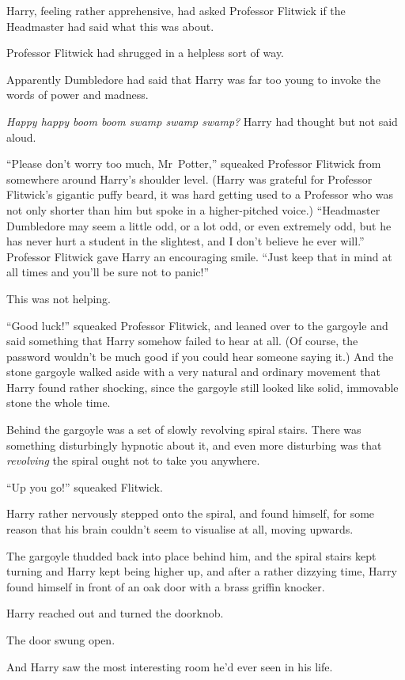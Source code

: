 Harry, feeling rather apprehensive, had asked Professor Flitwick if the Headmaster had said what this was about.

Professor Flitwick had shrugged in a helpless sort of way.

Apparently Dumbledore had said that Harry was far too young to invoke the words of power and madness.

\emph{Happy happy boom boom swamp swamp swamp?} Harry had thought but not said aloud.

“Please don’t worry too much, Mr~Potter,” squeaked Professor Flitwick from somewhere around Harry’s shoulder level. (Harry was grateful for Professor Flitwick’s gigantic puffy beard, it was hard getting used to a Professor who was not only shorter than him but spoke in a higher-pitched voice.) “Headmaster Dumbledore may seem a little odd, or a lot odd, or even extremely odd, but he has never hurt a student in the slightest, and I don’t believe he ever will.” Professor Flitwick gave Harry an encouraging smile. “Just keep that in mind at all times and you’ll be sure not to panic!”

This was not helping.

“Good luck!” squeaked Professor Flitwick, and leaned over to the gargoyle and said something that Harry somehow failed to hear at all. (Of course, the password wouldn’t be much good if you could hear someone saying it.) And the stone gargoyle walked aside with a very natural and ordinary movement that Harry found rather shocking, since the gargoyle still looked like solid, immovable stone the whole time.

Behind the gargoyle was a set of slowly revolving spiral stairs. There was something disturbingly hypnotic about it, and even more disturbing was that \emph{revolving} the spiral ought not to take you anywhere.

“Up you go!” squeaked Flitwick.

Harry rather nervously stepped onto the spiral, and found himself, for some reason that his brain couldn’t seem to visualise at all, moving upwards.

The gargoyle thudded back into place behind him, and the spiral stairs kept turning and Harry kept being higher up, and after a rather dizzying time, Harry found himself in front of an oak door with a brass griffin knocker.

Harry reached out and turned the doorknob.

The door swung open.

And Harry saw the most interesting room he’d ever seen in his life.

